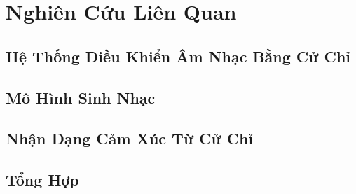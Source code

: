 ﻿\chapter{Nghiên Cứu Liên Quan}
\label{chap:related}
\section{Hệ Thống Điều Khiển Âm Nhạc Bằng Cử Chỉ}
\section{Mô Hình Sinh Nhạc}
\section{Nhận Dạng Cảm Xúc Từ Cử Chỉ}
\section{Tổng Hợp}
